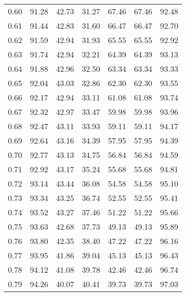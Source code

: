 \begin{tabular}{|c|c|c|c|c|c|c|}
      0.60 &     91.28 &     42.73 &      31.27 &   67.46 &      67.46 &         92.48 \\
      0.61 &     91.44 &     42.83 &      31.60 &   66.47 &      66.47 &         92.70 \\
      0.62 &     91.59 &     42.94 &      31.93 &   65.55 &      65.55 &         92.92 \\
      0.63 &     91.74 &     42.94 &      32.21 &   64.39 &      64.39 &         93.13 \\
      0.64 &     91.88 &     42.96 &      32.50 &   63.34 &      63.34 &         93.33 \\
      0.65 &     92.04 &     43.03 &      32.86 &   62.30 &      62.30 &         93.55 \\
      0.66 &     92.17 &     42.94 &      33.11 &   61.08 &      61.08 &         93.74 \\
      0.67 &     92.32 &     42.97 &      33.47 &   59.98 &      59.98 &         93.96 \\
      0.68 &     92.47 &     43.11 &      33.93 &   59.11 &      59.11 &         94.17 \\
      0.69 &     92.64 &     43.16 &      34.39 &   57.95 &      57.95 &         94.39 \\
      0.70 &     92.77 &     43.13 &      34.75 &   56.84 &      56.84 &         94.59 \\
      0.71 &     92.92 &     43.17 &      35.24 &   55.68 &      55.68 &         94.81 \\
      0.72 &     93.14 &     43.44 &      36.08 &   54.58 &      54.58 &         95.10 \\
      0.73 &     93.34 &     43.25 &      36.74 &   52.55 &      52.55 &         95.41 \\
      0.74 &     93.52 &     43.27 &      37.46 &   51.22 &      51.22 &         95.66 \\
      0.75 &     93.63 &     42.68 &      37.73 &   49.13 &      49.13 &         95.89 \\
      0.76 &     93.80 &     42.35 &      38.40 &   47.22 &      47.22 &         96.16 \\
      0.77 &     93.95 &     41.86 &      39.04 &   45.13 &      45.13 &         96.43 \\
      0.78 &     94.12 &     41.08 &      39.78 &   42.46 &      42.46 &         96.74 \\
      0.79 &     94.26 &     40.07 &      40.41 &   39.73 &      39.73 &         97.03 \\

\end{tabular}
